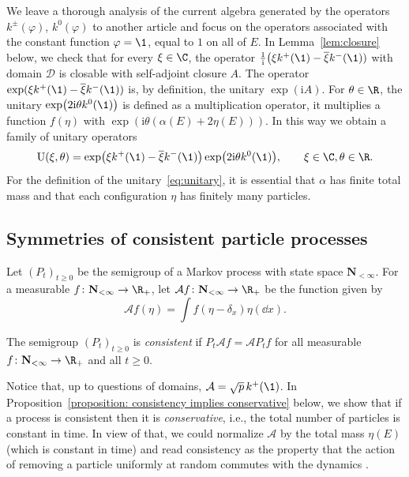 We leave a thorough analysis of the current algebra generated by the operators $k^\pm(\varphi)$, $k^0(\varphi)$ to another article \cite{algebraic_Floreani} and focus on the operators associated with the constant function $\varphi = \1$, equal to $1$ on all of $E$. In Lemma~\ref{lem:closure} below, we check that for every $\xi \in \C$, the operator $\frac{1}{\mathrm i} \bigl( \xi k^+(\1) - \overline{\xi} k^-(\1))$ with domain $\mathcal D$ is closable with self-adjoint closure $A$. The operator $\exp( \xi k^+(\1) - \overline{\xi} k^-(\1))$ is, by definition, the unitary $\exp(\mathrm i A)$.
For $\theta \in \R$, the unitary $\exp\bigl( 2\mathrm i \theta k^0(\1)\bigr)$ is defined as a multiplication operator, it multiplies a function $f(\eta)$ with $\exp(\mathrm i \theta (\alpha (E) + 2 \eta(E)))$.
In this way we obtain a family of unitary operators
\begin{equation}\label{eq:unitary}
	{\rm U}(\xi,\theta) = \exp\bigl( \xi k^+(\1) - \overline{\xi} k^-(\1)\bigr) \exp\bigl(2\mathrm i\theta k^0(\1)\bigr),\qquad \xi \in \C,\theta\in \R.
\end{equation}
For the definition of the unitary~\eqref{eq:unitary}, it is essential that $\alpha$ has finite total mass and that each configuration $\eta$ has finitely many particles.

\subsection{Symmetries of consistent particle processes}

Let $(P_t)_{t\geq 0}$ be the semigroup of a Markov process with state space $\mathbf N_{<\infty}$. For a measurable $f\colon \mathbf N_{<\infty} \to \R_+$, let $\mathcal A f\colon \mathbf N_{<\infty} \to \R_+$ be the function given by
\[
	\mathcal A f(\eta) = \int f(\eta-\delta_x)\eta(\dd x).
\]

\begin{Definition}
 The semigroup $(P_t)_{t\geq 0}$ is \emph{consistent} if $P_t \mathcal A f = \mathcal A P_t f$ for all measurable $f\colon \mathbf N_{<\infty}\to \R_+$ and all $t\geq 0$.
\end{Definition}

Notice that, up to questions of domains, $\mathcal A = \sqrt p\, k^+(\1)$. In Proposition~\ref{proposition: consistency implies conservative} below, we show that if a process is consistent then it is \emph{conservative}, i.e., the total number of particles is constant in time. In view of that, we could normalize $\mathcal A$ by the total mass $\eta(E)$ (which is constant in time) and read consistency as the property that the action of removing a particle uniformly at random commutes with the dynamics \cite{carinci2021consistent,IntertwiningConsistent}.

